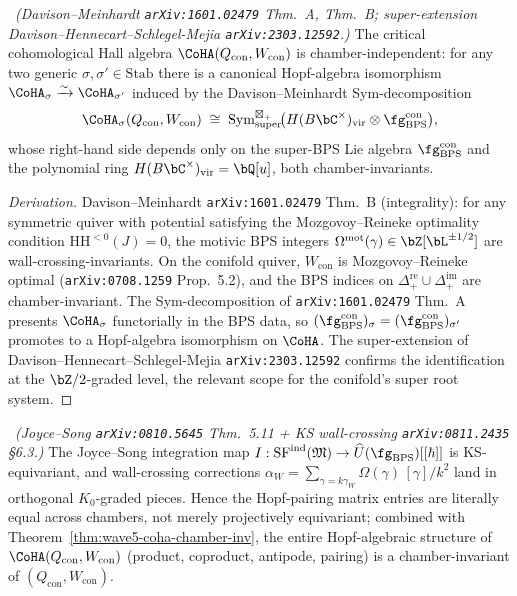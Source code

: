 \begin{theorem}
\label{thm:wave5-coha-chamber-inv}
\ClaimStatusProvedElsewhere\ \emph{(Davison--Meinhardt
\texttt{arXiv:1601.02479} Thm.~A, Thm.~B; super-extension
Davison--Hennecart--Schlegel-Mejia \texttt{arXiv:2303.12592}.)}
The critical cohomological Hall algebra $\CoHA(Q_{\mathrm{con}},
W_{\mathrm{con}})$ is chamber-independent: for any two generic
$\sigma, \sigma' \in \mathrm{Stab}$ there is a canonical Hopf-algebra
isomorphism $\CoHA_\sigma \xrightarrow{\sim} \CoHA_{\sigma'}$ induced
by the Davison--Meinhardt Sym-decomposition
\[
  \CoHA_\sigma(Q_{\mathrm{con}}, W_{\mathrm{con}})
  \;\cong\;
  \mathrm{Sym}^{\boxtimes_+}_{\mathrm{super}}\!\bigl(
    H(B\bC^\times)_{\mathrm{vir}} \otimes
    \fg_{\mathrm{BPS}}^{\mathrm{con}}
  \bigr),
\]
whose right-hand side depends only on the super-BPS Lie algebra
$\fg_{\mathrm{BPS}}^{\mathrm{con}}$ and the polynomial ring
$H(B\bC^\times)_{\mathrm{vir}} = \bQ[u]$, both chamber-invariants.
\end{theorem}

\begin{proof}[Derivation]
Davison--Meinhardt \texttt{arXiv:1601.02479} Thm.~B (integrality):
for any symmetric quiver with potential satisfying the
Mozgovoy--Reineke optimality condition $\mathrm{HH}^{<0}(J) = 0$, the
motivic BPS integers $\Omega^{\mathrm{mot}}(\gamma) \in
\bZ[\bL^{\pm 1/2}]$ are wall-crossing-invariants. On the conifold
quiver, $W_{\mathrm{con}}$ is Mozgovoy--Reineke optimal
(\texttt{arXiv:0708.1259} Prop.~5.2), and the BPS indices on
$\Delta_+^{\mathrm{re}} \cup \Delta_+^{\mathrm{im}}$ are
chamber-invariant. The Sym-decomposition of
\texttt{arXiv:1601.02479} Thm.~A presents $\CoHA_\sigma$ functorially
in the BPS data, so $(\fg_{\mathrm{BPS}}^{\mathrm{con}})_\sigma =
(\fg_{\mathrm{BPS}}^{\mathrm{con}})_{\sigma'}$ promotes to a
Hopf-algebra isomorphism on $\CoHA$. The super-extension of
Davison--Hennecart--Schlegel-Mejia \texttt{arXiv:2303.12592} confirms
the identification at the $\bZ/2$-graded level, the relevant scope
for the conifold's super root system.
\end{proof}

\begin{theorem}
\label{thm:wave5-chamber-inv-pairing}
\ClaimStatusProvedElsewhere\ \emph{(Joyce--Song
\texttt{arXiv:0810.5645} Thm.~5.11 + KS wall-crossing
\texttt{arXiv:0811.2435} §6.3.)}
The Joyce--Song integration map
$I : \mathrm{SF}^{\mathrm{ind}}(\mathfrak{M}) \to
\widehat{U}(\fg_{\mathrm{BPS}})[[\hbar]]$
is KS-equivariant, and wall-crossing corrections
$\alpha_W = \sum_{\gamma = k\gamma_W} \Omega(\gamma)\,[\gamma]/k^2$
land in orthogonal $K_0$-graded pieces. Hence the Hopf-pairing matrix
entries are literally equal across chambers, not merely projectively
equivariant; combined with Theorem~\ref{thm:wave5-coha-chamber-inv},
the entire Hopf-algebraic structure of $\CoHA(Q_{\mathrm{con}},
W_{\mathrm{con}})$ (product, coproduct, antipode, pairing) is a
chamber-invariant of $(Q_{\mathrm{con}}, W_{\mathrm{con}})$.
\end{theorem}

